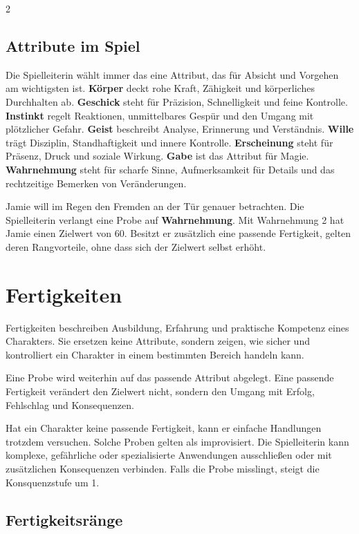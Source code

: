\begin{multicols*}{2}
\subsection{Attribute im Spiel}

Die Spielleiterin wählt immer das eine Attribut, das für Absicht und Vorgehen am wichtigsten ist.
\textbf{Körper} deckt rohe Kraft, Zähigkeit und körperliches Durchhalten ab.
\textbf{Geschick} steht für Präzision, Schnelligkeit und feine Kontrolle.
\textbf{Instinkt} regelt Reaktionen, unmittelbares Gespür und den Umgang mit plötzlicher Gefahr.
\textbf{Geist} beschreibt Analyse, Erinnerung und Verständnis.
\textbf{Wille} trägt Disziplin, Standhaftigkeit und innere Kontrolle.
\textbf{Erscheinung} steht für Präsenz, Druck und soziale Wirkung.
\textbf{Gabe} ist das Attribut für Magie.
\textbf{Wahrnehmung} steht für scharfe Sinne, Aufmerksamkeit für Details und das rechtzeitige Bemerken von Veränderungen.

\begin{pexample}
Jamie will im Regen den Fremden an der Tür genauer betrachten.
Die Spielleiterin verlangt eine Probe auf \textbf{Wahrnehmung}.
Mit Wahrnehmung 2 hat Jamie einen Zielwert von 60.
Besitzt er zusätzlich eine passende Fertigkeit, gelten deren Rangvorteile, ohne dass sich der Zielwert selbst erhöht.
\end{pexample}

\section{Fertigkeiten}\label{sec:fertigkeiten}

Fertigkeiten beschreiben Ausbildung, Erfahrung und praktische Kompetenz eines Charakters. Sie ersetzen keine Attribute, sondern zeigen, wie sicher und kontrolliert ein Charakter in einem bestimmten Bereich handeln kann.

Eine Probe wird weiterhin auf das passende Attribut abgelegt. Eine passende Fertigkeit verändert den Zielwert nicht, sondern den Umgang mit Erfolg, Fehlschlag und Konsequenzen.

Hat ein Charakter keine passende Fertigkeit, kann er einfache Handlungen trotzdem versuchen. Solche Proben gelten als improvisiert. Die Spielleiterin kann komplexe, gefährliche oder spezialisierte Anwendungen ausschließen oder mit zusätzlichen Konsequenzen verbinden. Falls die Probe misslingt, steigt die Konsquenzstufe um 1.

\subsection{Fertigkeitsränge}


\end{multicols*}
